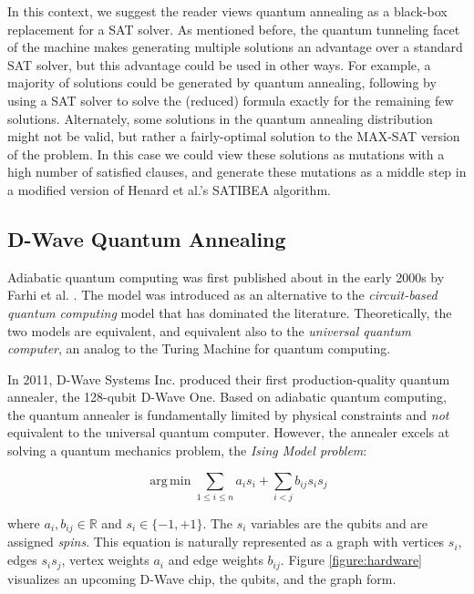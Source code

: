 \documentclass{sig-alternate-05-2015}
\DeclareMathOperator*{\argmin}{arg\,min}
\begin{document}
In this context, we suggest the reader views quantum annealing as a black-box replacement for a SAT solver. As mentioned before, the quantum tunneling facet of the machine makes generating multiple solutions an advantage over a standard SAT solver, but this advantage could be used in other ways. For example, a majority of solutions could be generated by quantum annealing, following by using a SAT solver to solve the (reduced) formula exactly for the remaining few solutions. Alternately, some solutions in the quantum annealing distribution might not be valid, but rather a fairly-optimal solution to the MAX-SAT version of the problem. In this case we could view these solutions as mutations with a high number of satisfied clauses, and generate these mutations as a middle step in a modified version of Henard et al.'s SATIBEA algorithm.

\subsection{D-Wave Quantum Annealing}

Adiabatic quantum computing was first published about in the early 2000s by Farhi et al. \cite{farhi2000quantum}. The model was introduced as an alternative to the \emph{circuit-based quantum computing} model that has dominated the literature. Theoretically, the two models are equivalent, and equivalent also to the \emph{universal quantum computer}, an analog to the Turing Machine for quantum computing.

In 2011, D-Wave Systems Inc. produced their first production-quality quantum annealer, the 128-qubit D-Wave One. Based on adiabatic quantum computing, the quantum annealer is fundamentally limited by physical constraints and \emph{not} equivalent to the universal quantum computer. However, the annealer excels at solving a quantum mechanics problem, the \emph{Ising Model problem}:

\begin{equation}
\label{eq:ising}
    \displaystyle \argmin \sum_{1 \leq i \leq n} a_i s_i + \sum_{i < j} b_{ij} s_i s_j
\end{equation}

where $a_i, b_{ij} \in \mathbb{R}$ and $s_i \in \{-1, +1\}$. The $s_i$ variables are the qubits and are assigned \emph{spins}. This equation is naturally represented as a graph with vertices $s_i$, edges $s_i s_j$, vertex weights $a_i$ and edge weights $b_{ij}$. Figure \ref{figure:hardware} visualizes an upcoming D-Wave chip, the qubits, and the graph form.
\end{document}

